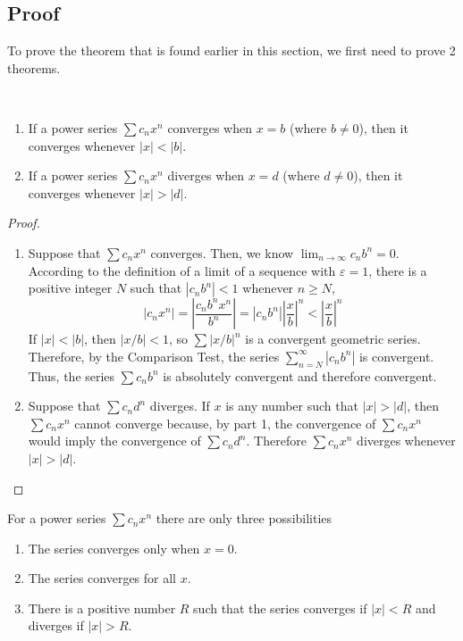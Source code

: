   \subsection*{Proof}
    To prove the theorem that is found earlier in this section, we first need to prove 2 theorems.
    \begin{theorem}
      \hphantom{ }\\
      \begin{enumerate}
        \item If a power series $\sum c_n x^n$ converges when $x=b$ (where $b \neq 0$), then it converges whenever $|x|<|b|$.
        \item If a power series $\sum c_n x^n$ diverges when $x=d$ (where $d \neq 0$), then it converges whenever $|x|>|d|$.
      \end{enumerate}
    \end{theorem}
    \begin{proof}\let\qed\relax
      \hphantom{ }\\
      \begin{enumerate}
        \item Suppose that $\sum c_n x^n$ converges. Then, we know $\lim_{n\to\infty} c_n b^n = 0$. According to the definition of a limit of a sequence with $\varepsilon = 1$, there is a positive integer $N$ such that $|c_n b^n|<1$ whenever $n \geq N$,
        $$|c_n x^n| = \left| \frac{c_n b^n x^n}{b^n} \right| = |c_n b^n| \left| \frac{x}{b} \right|^n < \left| \frac{x}{b} \right|^n $$
        If $|x|<|b|$, then $|x/b|<1$, so $\sum |x/b|^n$ is a convergent geometric series. Therefore, by the Comparison Test, the series $\sum_{n=N}^{\infty} |c_n b^n|$ is convergent. Thus, the series $\sum c_n b^n$ is absolutely convergent and therefore convergent.
        \item Suppose that $\sum c_n d^n$ diverges. If $x$ is any number such that $|x| > |d|$, then $\sum c_n x^n$ cannot converge because, by part 1, the convergence of $\sum c_n x^n$ would imply the convergence of $\sum c_n d^n$. Therefore $\sum c_n x^n$ diverges whenever $|x| > |d|$.
      \end{enumerate}
    \end{proof}
    \begin{theorem}
      For a power series $\sum c_n x^n$ there are only three possibilities
      \begin{enumerate}
        \item The series converges only when $x=0$.
        \item The series converges for all $x$.
        \item There is a positive number $R$ such that the series converges if $|x|<R$ and diverges if $|x|>R$.
      \end{enumerate}
    \end{theorem}
